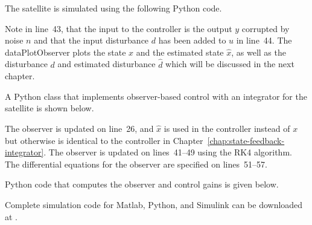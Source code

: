 The satellite is simulated using the following Python code.

Note in line~43, that the input to the controller is the output $y$ corrupted by noise $n$ and that the input disturbance $d$ has been added to $u$ in line~44.  The dataPlotObserver plots the state $x$ and the estimated state $\hat{x}$, as well as the disturbance $d$ and estimated disturbance $\hat{d}$ which will be discussed in the next chapter.  

A Python class that implements observer-based control with an integrator for the satellite is shown below.

The observer is updated on line~26, and $\hat{x}$ is used in the controller instead of $x$ but otherwise is identical to the controller in Chapter~\ref{chap:state-feedback-integrator}.  The observer is updated on lines~41--49 using the RK4 algorithm.  The differential equations for the observer are specified on lines~51--57.  

Python code that computes the observer and control gains is given below.


Complete simulation code for Matlab, Python, and Simulink can be downloaded at .

